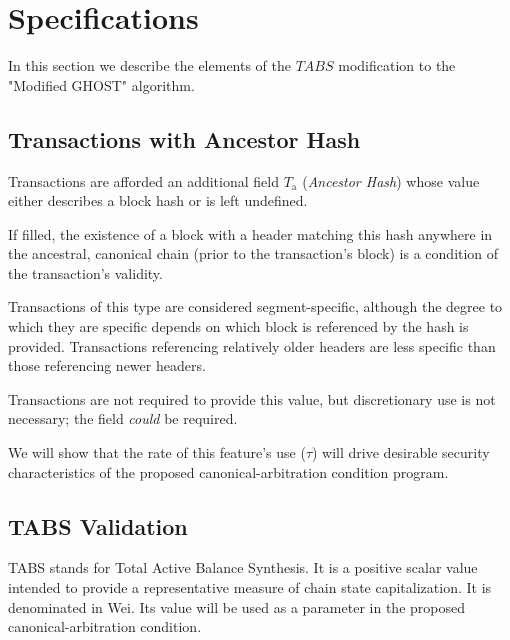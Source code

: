 \documentclass[11pt]{article}
\theoremstyle{plain}
\begin{document}

\pagebreak
\section{\normalsize{Specifications}}


In this section we describe the elements of the $TABS$ modification to the
"Modified GHOST" algorithm.

\subsection{\small{Transactions with Ancestor Hash}}\label{sec: S2.1}

Transactions are afforded an additional field $T_\mathrm{a}$ (\textit{Ancestor
Hash}) whose value either describes a block hash or is left undefined.

If filled, the existence of a block with a header matching this hash anywhere
in the ancestral, canonical chain (prior to the transaction's block) is a
condition of the transaction's validity.

Transactions of this type are considered segment-specific, although the degree
to which they are specific depends on which block is referenced by the hash is
provided.
Transactions referencing relatively older headers are less specific than those
referencing newer headers.

Transactions are not required to provide this value, but discretionary use is not 
necessary; the field \textit{could} be required.

We will show that the rate of this feature's use ($\tau$) will drive desirable
security characteristics of the proposed canonical-arbitration condition
program.


\subsection{\small{TABS Validation}}\label{sec: S3.1}

TABS stands for Total Active Balance Synthesis.
It is a positive scalar value intended to provide a representative measure of 
chain state capitalization.
It is denominated in Wei.
Its value will be used as a parameter in the proposed canonical-arbitration
condition.
\end{document}
